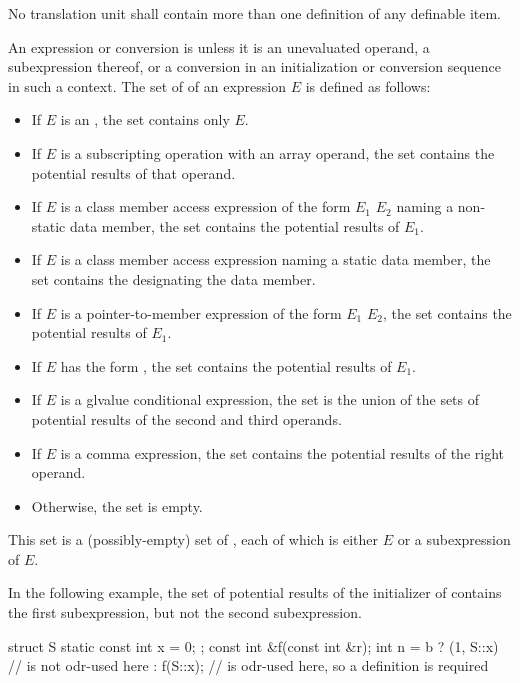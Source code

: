 \pnum
No translation unit shall contain more than one definition of any
definable item.

\pnum
{}%
An expression or conversion is  unless it is
an unevaluated operand,
a subexpression thereof, or
a conversion in an initialization or conversion sequence in such a context.
The set of  of an expression $E$ is
defined as follows:
\begin{itemize}
\item If $E$ is an
, the set
contains only $E$.
\item If $E$ is a subscripting operation with
an array operand, the set contains the potential results of that operand.
\item If $E$ is a class member access
expression of the form
$E_1$   $E_2$
naming a non-static data member,
the set contains the potential results of $E_1$.
\item If $E$ is a class member access expression
naming a static data member,
the set contains the  designating the data member.
\item If $E$ is a pointer-to-member
expression of the form
$E_1$  $E_2$,
the set contains the potential results of $E_1$.
\item If $E$ has the form , the set contains the
potential results of $E_1$.
\item If $E$ is a glvalue conditional
expression, the set is the union of the sets of
potential results of the second and third operands.
\item If $E$ is a comma expression, the set
contains the potential results of the right operand.
\item Otherwise, the set is empty.
\end{itemize}
\begin{note}
This set is a (possibly-empty) set of ,
each of which is either $E$ or a subexpression of $E$.
\begin{example}
In the following example, the set of potential results of the initializer
of  contains the first  subexpression, but not the second
 subexpression.
\begin{codeblock}
struct S { static const int x = 0; };
const int &f(const int &r);
int n = b ? (1, S::x)           //  is not odr-used here
          : f(S::x);            //  is odr-used here, so a definition is required
\end{codeblock}
\end{example}
\end{note}

